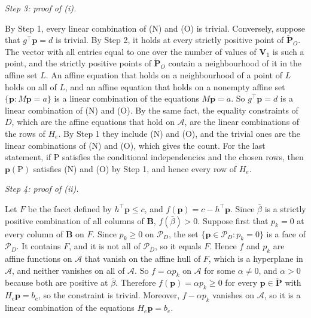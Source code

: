 \documentclass[12pt]{article}
\def\Pr{{\mathrm{P}}}
\newcommand{\bV}{\boldsymbol{V}}
\begin{document}
\emph{Step 3: proof of (i).} 

By Step 1, every linear combination of (N) and (O) is trivial. Conversely, suppose that $g^\top \boldsymbol{p} = d$ is trivial. By Step 2, it holds at every strictly positive point of $\boldsymbol{\check{P}}_O$. The vector with all entries equal to one over the number of values of $\bV_1$ is such a point, and the strictly positive points of $\boldsymbol{\check{P}}_O$ contain a neighbourhood of it in the affine set $L$. An affine equation that holds on a neighbourhood of a point of $L$ holds on all of $L$, and an affine equation that holds on a nonempty affine set $\{\boldsymbol{p} : M\boldsymbol{p} = a\}$ is a linear combination of the equations $M\boldsymbol{p} = a$. So $g^\top \boldsymbol{p} = d$ is a linear combination of (N) and (O). By the same fact, the equality constraints of $D$, which are the affine equations that hold on $\mathcal{A}$, are the linear combinations of the rows of $H_e$. By Step 1 they include (N) and (O), and the trivial ones are the linear combinations of (N) and (O), which gives the count. For the last statement, if $\Pr$ satisfies the conditional independencies and the chosen rows, then $\boldsymbol{p}(\Pr)$ satisfies (N) and (O) by Step 1, and hence every row of $H_e$.

\emph{Step 4: proof of (ii).} 

Let $F$ be the facet defined by $h^\top \boldsymbol{p} \leq c$, and $f(\boldsymbol{p}) = c - h^\top \boldsymbol{p}$. Since $\bar\beta$ is a strictly positive combination of all columns of $\boldsymbol{B}$, $f(\bar\beta) > 0$. Suppose first that $p_k = 0$ at every column of $\boldsymbol{B}$ on $F$. Since $p_k \geq 0$ on $\mathcal{P}_D$, the set $\{\boldsymbol{p} \in \mathcal{P}_D : p_k = 0\}$ is a face of $\mathcal{P}_D$. It contains $F$, and it is not all of $\mathcal{P}_D$, so it equals $F$. Hence $f$ and $p_k$ are affine functions on $\mathcal{A}$ that vanish on the affine hull of $F$, which is a hyperplane in $\mathcal{A}$, and neither vanishes on all of $\mathcal{A}$. So $f = \alpha p_k$ on $\mathcal{A}$ for some $\alpha \neq 0$, and $\alpha > 0$ because both are positive at $\bar\beta$. Therefore $f(\boldsymbol{p}) = \alpha p_k \geq 0$ for every $\boldsymbol{p} \in \boldsymbol{\check{P}}$ with $H_e \boldsymbol{p} = b_e$, so the constraint is trivial. Moreover, $f - \alpha p_k$ vanishes on $\mathcal{A}$, so it is a linear combination of the equations $H_e \boldsymbol{p} = b_e$.
\end{document}
